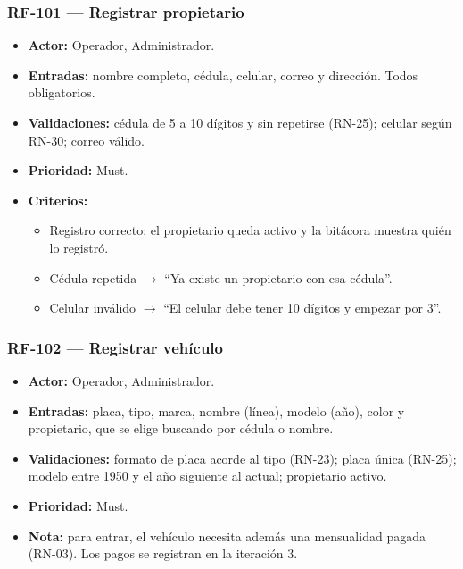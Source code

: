 \subsubsection{RF-101 — Registrar propietario}
\begin{itemize}
  \item \textbf{Actor:} Operador, Administrador.
  \item \textbf{Entradas:} nombre completo, cédula, celular, correo y dirección. Todos obligatorios.
  \item \textbf{Validaciones:} cédula de 5 a 10 dígitos y sin repetirse (RN-25); celular según RN-30; correo válido.
  \item \textbf{Prioridad:} Must.
  \item \textbf{Criterios:}
  \begin{itemize}\item Registro correcto: el propietario queda activo y la bitácora muestra quién lo registró.\end{itemize}
  \begin{itemize}\item Cédula repetida $\rightarrow$ ``Ya existe un propietario con esa cédula''.\end{itemize}
  \begin{itemize}\item Celular inválido $\rightarrow$ ``El celular debe tener 10 dígitos y empezar por 3''.\end{itemize}
\end{itemize}

\subsubsection{RF-102 — Registrar vehículo}
\begin{itemize}
  \item \textbf{Actor:} Operador, Administrador.
  \item \textbf{Entradas:} placa, tipo, marca, nombre (línea), modelo (año), color y propietario, que se elige buscando por cédula o nombre.
  \item \textbf{Validaciones:} formato de placa acorde al tipo (RN-23); placa única (RN-25); modelo entre 1950 y el año siguiente al actual; propietario activo.
  \item \textbf{Prioridad:} Must.
  \item \textbf{Nota:} para entrar, el vehículo necesita además una mensualidad pagada (RN-03). Los pagos se registran en la iteración 3.
\end{itemize}

